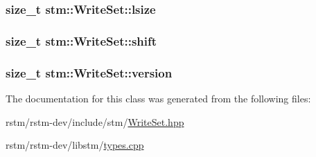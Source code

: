 \hypertarget{classstm_1_1WriteSet_a95f05e20e05269065de443a716aa7b6c}{
\subsubsection[{lsize}]{\setlength{\rightskip}{0pt plus 5cm}size\-\_\-t stm\-::\-Write\-Set\-::lsize\hspace{0.3cm}{\ttfamily [private]}}}\label{classstm_1_1WriteSet_a95f05e20e05269065de443a716aa7b6c}
\hypertarget{classstm_1_1WriteSet_a73bd9654a4702f75163b10c275a0353f}{
\subsubsection[{shift}]{\setlength{\rightskip}{0pt plus 5cm}size\-\_\-t stm\-::\-Write\-Set\-::shift\hspace{0.3cm}{\ttfamily [private]}}}\label{classstm_1_1WriteSet_a73bd9654a4702f75163b10c275a0353f}
\hypertarget{classstm_1_1WriteSet_ac226645f8f45a68b9a380bdb94dd5978}{
\subsubsection[{version}]{\setlength{\rightskip}{0pt plus 5cm}size\-\_\-t stm\-::\-Write\-Set\-::version\hspace{0.3cm}{\ttfamily [private]}}}\label{classstm_1_1WriteSet_ac226645f8f45a68b9a380bdb94dd5978}


The documentation for this class was generated from the following files\-:\begin{DoxyCompactItemize}
\item 
rstm/rstm-\/dev/include/stm/\hyperlink{WriteSet_8hpp}{Write\-Set.\-hpp}\item 
rstm/rstm-\/dev/libstm/\hyperlink{types_8cpp}{types.\-cpp}\end{DoxyCompactItemize}
